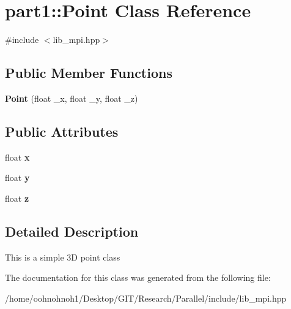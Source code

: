 \hypertarget{classpart1_1_1Point}{}\section{part1\+:\+:Point Class Reference}
\label{classpart1_1_1Point}


{\ttfamily \#include $<$lib\+\_\+mpi.\+hpp$>$}

\subsection*{Public Member Functions}
\begin{DoxyCompactItemize}
\item 
\mbox{\label{classpart1_1_1Point_a483975ffea2151c9b12890c086bcbcc6}} 
{\bfseries Point} (float \+\_\+x, float \+\_\+y, float \+\_\+z)
\end{DoxyCompactItemize}
\subsection*{Public Attributes}
\begin{DoxyCompactItemize}
\item 
\mbox{\label{classpart1_1_1Point_a179479d169ee6cedc42c61aaaa51935e}} 
float {\bfseries x}
\item 
\mbox{\label{classpart1_1_1Point_a8842e404aca1f960a1ab7d9bcffc16cf}} 
float {\bfseries y}
\item 
\mbox{\label{classpart1_1_1Point_a246edeeae578e2d733be9d888c59b980}} 
float {\bfseries z}
\end{DoxyCompactItemize}


\subsection{Detailed Description}
This is a simple 3D point class 

The documentation for this class was generated from the following file\+:\begin{DoxyCompactItemize}
\item 
/home/oohnohnoh1/\+Desktop/\+G\+I\+T/\+Research/\+Parallel/include/lib\+\_\+mpi.\+hpp\end{DoxyCompactItemize}
